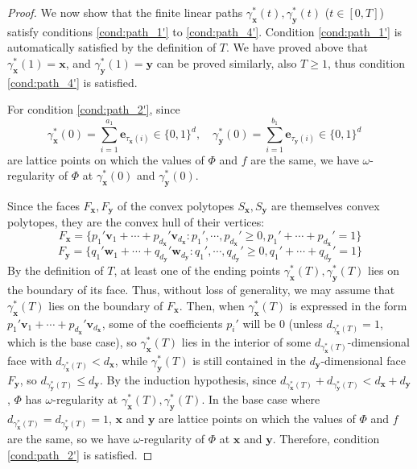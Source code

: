\documentclass{article}
\numberwithin{equation}{section}
\theoremstyle{definition}
\begin{document}
\begin{proof}
We now show that the finite linear paths $\gamma_{\mathbf{x}}^{\ast}(t),\gamma_{\mathbf{y}}^{\ast}(t)$ ($t\in [0,T]$) satisfy conditions \ref{cond:path_1'} to \ref{cond:path_4'}. Condition \ref{cond:path_1'} is automatically satisfied by the definition of $T$. We have proved above that $\gamma_{\mathbf{x}}^{\ast}(1) = \mathbf{x}$, and $\gamma_{\mathbf{y}}^{\ast}(1) = \mathbf{y}$ can be proved similarly, also $T\ge 1$, thus condition \ref{cond:path_4'} is satisfied. 

For condition \ref{cond:path_2'}, since
$$\gamma_{\mathbf{x}}^{\ast}(0) 
= \sum_{i=1}^{a_1} \mathbf{e}_{\tau_{\mathbf{x}}(i)}
\in \{0,1\}^d, \quad
\gamma_{\mathbf{y}}^{\ast}(0) 
= \sum_{i=1}^{b_1} \mathbf{e}_{\tau_{\mathbf{y}}(i)}
\in \{0,1\}^d
\quad$$
are lattice points on which the values of $\Phi$ and $f$ are the same, we have $\omega$-regularity of $\Phi$ at $\gamma_{\mathbf{x}}^{\ast}(0)$ and $\gamma_{\mathbf{y}}^{\ast}(0)$.

Since the faces $F_{\mathbf{x}},F_{\mathbf{y}}$ of the convex polytopes $S_{\mathbf{x}},S_{\mathbf{y}}$ are themselves convex polytopes, they are the convex hull of their vertices:
$$F_{\mathbf{x}} = \{
    p_1' \mathbf{v}_1 + 
    \cdots + 
    p_{d_{\mathbf{x}}}' \mathbf{v}_{d_{\mathbf{x}}} :
    p_1', \cdots, p_{d_{\mathbf{x}}}' \ge 0,
    p_1' + \cdots + p_{d_{\mathbf{x}}}' = 1
\}$$
$$F_{\mathbf{y}} = \{
    q_1' \mathbf{w}_1 + 
    \cdots + 
    q_{d_{\mathbf{y}}}' \mathbf{w}_{d_{\mathbf{y}}} :
    q_1', \cdots, q_{d_{\mathbf{y}}}' \ge 0,
    q_1' + \cdots + q_{d_{\mathbf{y}}}' = 1
\}$$
By the definition of $T$, at least one of the ending points $\gamma_{\mathbf{x}}^{\ast}(T),\gamma_{\mathbf{y}}^{\ast}(T)$ lies on the boundary of its face. Thus, without loss of generality, we may assume that $\gamma_{\mathbf{x}}^{\ast}(T)$ lies on the boundary of $F_{\mathbf{x}}$. Then, when $\gamma_{\mathbf{x}}^{\ast}(T)$ is expressed in the form 
$p_1' \mathbf{v}_1 + 
\cdots + 
p_{d_{\mathbf{x}}}' \mathbf{v}_{d_{\mathbf{x}}}$, 
some of the coefficients $p_i'$ will be $0$ (unless $d_{\gamma_{\mathbf{x}}^{\ast}(T)}=1$, which is the base case), so $\gamma_{\mathbf{x}}^{\ast}(T)$ lies in the interior of some $d_{\gamma_{\mathbf{x}}^{\ast}(T)}$-dimensional face with $d_{\gamma_{\mathbf{x}}^{\ast}(T)} < d_{\mathbf{x}}$, while $\gamma_{\mathbf{y}}^{\ast}(T)$ is still contained in the $d_{\mathbf{y}}$-dimensional face $F_{\mathbf{y}}$, so $d_{\gamma_{\mathbf{y}}^{\ast}(T)}\le d_{\mathbf{y}}$. By the induction hypothesis, since $d_{\gamma_{\mathbf{x}}^{\ast}(T)}+d_{\gamma_{\mathbf{y}}^{\ast}(T)} < d_{\mathbf{x}}+d_{\mathbf{y}}$, $\Phi$ has $\omega$-regularity at $\gamma_{\mathbf{x}}^{\ast}(T),\gamma_{\mathbf{y}}^{\ast}(T)$. In the base case where $d_{\gamma_{\mathbf{x}}^{\ast}(T)}=d_{\gamma_{\mathbf{y}}^{\ast}(T)}=1$, $\mathbf{x}$ and $\mathbf{y}$ are lattice points on which the values of $\Phi$ and $f$ are the same, so we have $\omega$-regularity of $\Phi$ at $\mathbf{x}$ and $\mathbf{y}$. Therefore, condition \ref{cond:path_2'} is satisfied. 


\end{proof}
\end{document}
